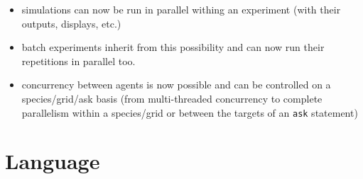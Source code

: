 \documentclass[]{book}
\providecommand{\tightlist}{%
  \setlength{\itemsep}{0pt}\setlength{\parskip}{0pt}}
\theoremstyle{definition}
\theoremstyle{definition}
\theoremstyle{definition}
\theoremstyle{remark}
\begin{document}
\begin{itemize}
\tightlist
\item
  simulations can now be run in parallel withing an experiment (with
  their outputs, displays, etc.)
\item
  batch experiments inherit from this possibility and can now run their
  repetitions in parallel too.
\item
  concurrency between agents is now possible and can be controlled on a
  species/grid/ask basis (from multi-threaded concurrency to complete
  parallelism within a species/grid or between the targets of an
  \texttt{ask} statement)
\end{itemize}

\section{Language}\label{language}
\end{document}
